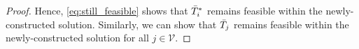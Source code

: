 \begin{proof}
Hence, \eqref{eq:still_feasible} shows that $\bar{T}_{i}^{*}$ remains feasible within the newly-constructed solution.  Similarly, we can show that $\bar{T}_{j}$ remains feasible within the newly-constructed solution for all $j \in \mathcal{V}$.

%

\end{proof}


